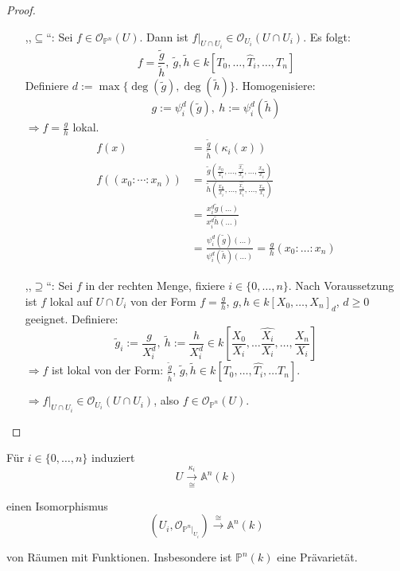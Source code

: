 \begin{proof}
  \mbox{}
  \begin{itemize}
  \item[,,$\subseteq$``:] Sei $f\in\mathcal{O}_{\mathbb{P}^{n}}(U)$. Dann ist $f|_{U\cap U_{i}}\in\mathcal{O}_{U_{i}}(U\cap U_{i})$.
    Es folgt:
    \[
      f=\frac{\tilde{g}}{\tilde{h}},\ \tilde{g},\tilde{h}\in k[T_{0},\ldots,\hat{T}_{i},\ldots,T_{n}]
    \]
    Definiere $d:=\max\{\deg(\tilde{g}),\deg(\tilde{h})\}$. Homogenisiere:
    \[
      g:=\psi_{i}^{d}(\tilde{g}),\ h:=\psi_{i}^{d}(\tilde{h})
    \]
    $\Rightarrow f=\frac{g}{h}$ lokal. 
    \begin{align*}
      f(x) & =\frac{\tilde{g}}{\tilde{h}}(\kappa_{i}(x))\\
      f((x_{0}:\cdots:x_{n})) & =\frac{\tilde{g}\left(\frac{x_{0}}{x_{i}},\ldots,\frac{\hat{x_{i}}}{x_{i}},\ldots,\frac{x_{n}}{x_{i}}\right)}{\tilde{h}\left(\frac{x_{0}}{x_{i}},\ldots,\frac{\hat{x_{i}}}{x_{i}},\ldots,\frac{x_{n}}{x_{i}}\right)}\\
           & =\frac{x_{i}^{d}\tilde{g}(\ldots)}{x_{i}^{d}\tilde{h}(\ldots)}\\
           & =\frac{\psi_{i}^{d}(\tilde{g})(\ldots)}{\psi_{i}^{d}(\tilde{h})(\ldots)}=\frac{g}{h}(x_{0}:\ldots:x_{n})
    \end{align*}
  \item[,,$\supseteq$``:] Sei $f$ in der rechten Menge, fixiere $i\in\{0,\ldots,n\}$. Nach Voraussetzung ist $f$ lokal
    auf $U\cap U_{i}$ von der Form $f = \frac{g}{h}$, $g,h\in k[X_{0},\ldots,X_{n}]_{d}$, $d\geq 0$ geeignet. Definiere:
    \[
      \tilde{g}_{i}:=\frac{g}{X_{i}^{d}},\ \tilde{h}:=\frac{h}{X_{i}^{d}}\in k\left[\frac{X_{0}}{X_{i}},\ldots\hat{\frac{X_{i}}{X_{i}}},\ldots,\frac{X_{n}}{X_{i}}\right]
    \]
    $\Rightarrow f$ ist lokal von der Form: $\frac{\tilde{g}}{\tilde{h}}$,
    $\tilde{g},$$\tilde{h}\in k[T_{0},\ldots,\hat{T_{i}},\ldots T_{n}]$.

    $\Rightarrow f|_{U\cap U_{i}}\in\mathcal{O}_{U_{i}}(U\cap U_{i})$, also $f \in \mathcal{O}_{\mathbb{P}^{n}}(U)$.

  \end{itemize}
\end{proof}
\begin{cor}[orig. 52]
  \label{cor:affine-ueberdeckung-des-projektiven-raumes}
  Für $i\in\{0,\ldots,n\}$ induziert
  \[
    U\xrightarrow[\cong]{\kappa_{i}}\mathbb{A}^{n}(k)
  \]

  einen Isomorphismus
  \[
    (U_{i},\mathcal{O}_{\mathbb{P}^{n}|_{U_{i}}})\xrightarrow{\cong}\mathbb{A}^{n}(k)
  \]

  von Räumen mit Funktionen. Insbesondere ist $\mathbb{P}^{n}(k)$ eine
  Prävarietät.
\end{cor}
